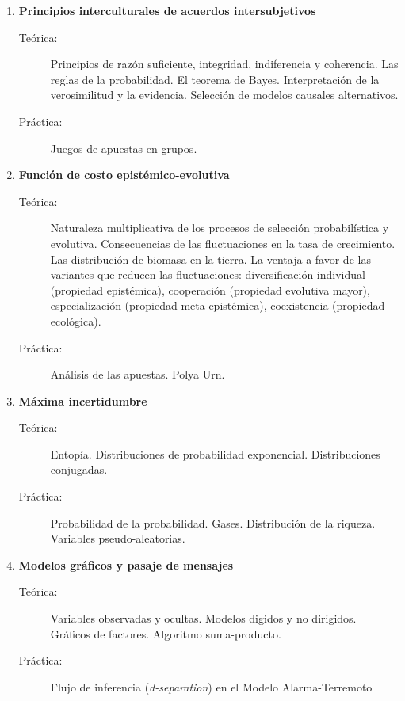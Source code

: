 \documentclass[10pt]{article}
\begin{document}
\begin{enumerate}

\item \textbf{Principios interculturales de acuerdos intersubjetivos}
\vspace{-0.15cm}
\begin{description}
\item[Teórica:] Principios de razón suficiente, integridad, indiferencia y coherencia. Las reglas de la probabilidad. El teorema de Bayes. Interpretación de la verosimilitud y la evidencia. Selección de modelos causales alternativos. 
\item[Práctica:] Juegos de apuestas en grupos. 
\end{description}

\vspace{0.1cm}
\item \textbf{Función de costo epistémico-evolutiva}
\vspace{-0.15cm}
\begin{description}
\item[Teórica:] Naturaleza multiplicativa de los procesos de selección probabilística y evolutiva. Consecuencias de las fluctuaciones en la tasa de crecimiento. Las distribución de biomasa en la tierra. La ventaja a favor de las variantes que reducen las fluctuaciones: diversificación individual (propiedad epistémica), cooperación (propiedad evolutiva mayor), especialización (propiedad meta-epistémica), coexistencia (propiedad ecológica).
\item[Práctica:] Análisis de las apuestas. Polya Urn. 
\end{description}


\vspace{0.1cm}
\item \textbf{Máxima incertidumbre}
\vspace{-0.15cm}
\begin{description}
\item[Teórica:] Entopía. Distribuciones de probabilidad exponencial. Distribuciones conjugadas. 
\item[Práctica:] Probabilidad de la probabilidad. Gases. Distribución de la riqueza. Variables pseudo-aleatorias.
\end{description}


\vspace{0.1cm}
\item \textbf{Modelos gráficos y pasaje de mensajes}
\vspace{-0.15cm}
\begin{description}
\item[Teórica:] Variables observadas y ocultas. Modelos digidos y no dirigidos. Gráficos de factores. Algoritmo suma-producto. 
\item[Práctica:] Flujo de inferencia (\emph{d-separation}) en el Modelo Alarma-Terremoto
\end{description}


\end{enumerate}
\end{document}
